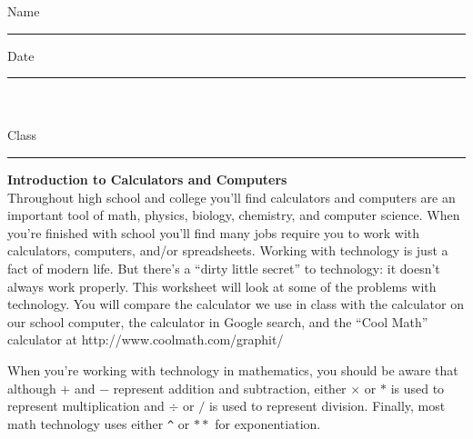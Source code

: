 \documentclass[12pt]{article}%
\begin{document}
\noindent Name \rule{80 mm}{.2pt} \hspace{35 mm} Date \rule{25 mm}{.2pt}\\\\
Class \rule{30 mm}{.2pt} \hspace{10 mm}\textbf{Introduction to Calculators and Computers}\\

Throughout high school and college you'll find calculators and computers are an important
tool of math, physics, biology, chemistry, and computer science. When you're finished with 
school you'll find many jobs require you to work with calculators, computers, and/or
spreadsheets. Working with technology is just a fact of modern life. But there's a ``dirty
little secret'' to technology: it doesn't always work properly. This worksheet will look
at some of the problems with technology. You will compare the calculator we use in class 
with the calculator on our school computer, the calculator in Google search, and the 
``Cool Math'' calculator at http://www.coolmath.com/graphit/

When you're working with technology in mathematics, you should be aware that although 
$+$ and $-$ represent addition and subtraction, either
$\times$ or $\ast$ is used to represent multiplication and $\div$ or $\slash$ is used to
represent division. Finally, most math technology uses either \verb!^! or $\ast \ast$ 
for exponentiation.
\end{document}
